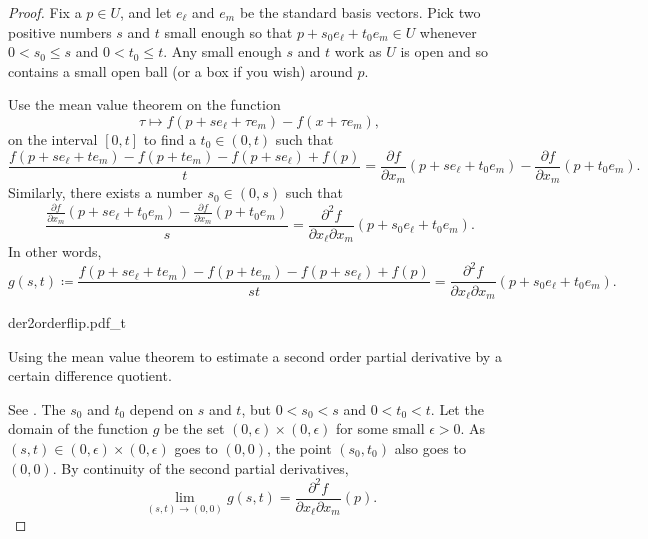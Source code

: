 \begin{proof}
Fix a $p \in U$, and let $e_{\ell}$ and $e_m$ be the standard basis vectors.
Pick two positive numbers $s$ and $t$ small enough so that
$p+s_0e_{\ell} +t_0e_m \in U$ whenever
$0 < s_0 \leq s$ and $0 < t_0 \leq t$.
Any small enough $s$ and $t$ work as $U$ is open and so
contains a small open ball (or a box if you wish) around $p$.

Use the mean value theorem on the function
\begin{equation*}
\tau \mapsto f(p+se_{\ell} + \tau e_m)-f(x + \tau e_m) ,
\end{equation*}
on the interval $[0,t]$
to find a $t_0 \in (0,t)$
such that
\begin{equation*}
\frac{f(p+se_{\ell} + te_m)- f(p+t e_m) - f(p+s e_{\ell})+f(p)}{t}
=
\frac{\partial f}{\partial x_m}(p + s e_{\ell} + t_0 e_m)
-
\frac{\partial f}{\partial x_m}(p + t_0 e_m) .
\end{equation*}
Similarly, there exists a number $s_0 \in (0,s)$ such that
\begin{equation*}
\frac{\frac{\partial f}{\partial x_m}(p + s e_{\ell} + t_0 e_m)
-
\frac{\partial f}{\partial x_m}(p + t_0 e_m)}{s}
=
\frac{\partial^2 f}{\partial x_{\ell} \partial x_m}(p + s_0 e_{\ell} + t_0 e_m) .
\end{equation*}
In other words,
\begin{equation*}
g(s,t) \coloneqq
\frac{f(p+se_{\ell} + te_m)- f(p+t e_m) - f(p+s e_{\ell})+f(p)}{st}
=
\frac{\partial^2 f}{\partial x_{\ell} \partial x_m}(p + s_0 e_{\ell} + t_0 e_m) .
\end{equation*}

\begin{myfigureht}
{der2orderflip.pdf_t}
\caption{Using the mean value theorem to estimate
a second order partial derivative by
a certain difference quotient.\label{fig:der2orderflip}}
\end{myfigureht}

See .
The $s_0$ and $t_0$ depend on $s$ and $t$,
but $0 < s_0 < s$ and
$0 < t_0 < t$.
Let the domain of the function $g$ be the set $(0,\epsilon) \times
(0,\epsilon)$ for some small $\epsilon > 0$.
As $(s,t) \in (0,\epsilon) \times (0,\epsilon)$ goes to $(0,0)$,
the point
$(s_0,t_0)$ also goes to $(0,0)$.
By continuity of the second partial derivatives,
\begin{equation*}
\lim_{(s,t) \to (0,0)} g(s,t) = 
\frac{\partial^2 f}{\partial x_{\ell} \partial x_m}(p) .
\end{equation*}


\end{proof}
